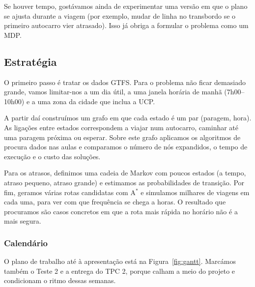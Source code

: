 \documentclass[11pt,a4paper]{article}
\newcommand{\AStar}{A$^{*}$}
\begin{document}
Se houver tempo, gostávamos ainda de experimentar uma versão em que o
plano se ajusta durante a viagem (por exemplo, mudar de linha no
transbordo se o primeiro autocarro vier atrasado). Isso já obriga a
formular o problema como um MDP.

\subsection{Estratégia}

O primeiro passo é tratar os dados GTFS. Para o problema não ficar
demasiado grande, vamos limitar-nos a um dia útil, a uma janela horária
de manhã (7h00--10h00) e a uma zona da cidade que inclua a UCP.

A partir daí construímos um grafo em que cada estado é um par
(paragem, hora). As ligações entre estados correspondem a viajar num
autocarro, caminhar até uma paragem próxima ou esperar. Sobre este
grafo aplicamos os algoritmos de procura dados nas aulas e comparamos
o número de nós expandidos, o tempo de execução e o custo das soluções.

Para os atrasos, definimos uma cadeia de Markov com poucos estados
(a tempo, atraso pequeno, atraso grande) e estimamos as probabilidades
de transição. Por fim, geramos várias rotas candidatas com \AStar{} e
simulamos milhares de viagens em cada uma, para ver com que frequência
se chega a horas. O resultado que procuramos são casos concretos em que
a rota mais rápida no horário não é a mais segura.

\subsubsection*{Calendário}

O plano de trabalho até à apresentação está na
Figura~\ref{fig:gantt}. Marcámos também o Teste 2 e a entrega do TPC 2,
porque calham a meio do projeto e condicionam o ritmo dessas semanas.
\end{document}
